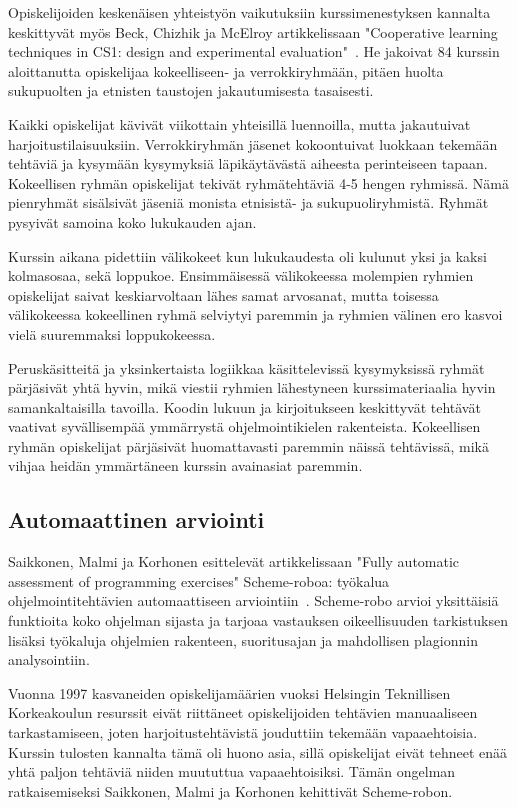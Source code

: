 \documentclass[finnish]{../tktltiki2}
\theoremstyle{definition}
\theoremstyle{remark}
\begin{document}
Opiskelijoiden keskenäisen yhteistyön vaikutuksiin kurssimenestyksen kannalta keskittyvät myös Beck, Chizhik ja McElroy artikkelissaan "Cooperative learning techniques in CS1: design and experimental evaluation"~\cite{BCM05}. He jakoivat 84 kurssin aloittanutta opiskelijaa kokeelliseen- ja verrokkiryhmään, pitäen huolta sukupuolten ja etnisten taustojen jakautumisesta tasaisesti.

Kaikki opiskelijat kävivät viikottain yhteisillä luennoilla, mutta jakautuivat harjoitustilaisuuksiin. Verrokkiryhmän jäsenet kokoontuivat luokkaan tekemään tehtäviä ja kysymään kysymyksiä läpikäytävästä aiheesta perinteiseen tapaan. Kokeellisen ryhmän opiskelijat tekivät ryhmätehtäviä 4-5 hengen ryhmissä. Nämä pienryhmät sisälsivät jäseniä monista etnisistä- ja sukupuoliryhmistä. Ryhmät pysyivät samoina koko lukukauden ajan.

Kurssin aikana pidettiin välikokeet kun lukukaudesta oli kulunut yksi ja kaksi kolmasosaa, sekä loppukoe. Ensimmäisessä välikokeessa molempien ryhmien opiskelijat saivat keskiarvoltaan lähes samat arvosanat, mutta toisessa välikokeessa kokeellinen ryhmä selviytyi paremmin ja ryhmien välinen ero kasvoi vielä suuremmaksi loppukokeessa.

Peruskäsitteitä ja yksinkertaista logiikkaa käsittelevissä kysymyksissä ryhmät pärjäsivät yhtä hyvin, mikä viestii ryhmien lähestyneen kurssimateriaalia hyvin samankaltaisilla tavoilla. Koodin lukuun ja kirjoitukseen keskittyvät tehtävät vaativat syvällisempää ymmärrystä ohjelmointikielen rakenteista. Kokeellisen ryhmän opiskelijat pärjäsivät huomattavasti paremmin näissä tehtävissä, mikä vihjaa heidän ymmärtäneen kurssin avainasiat paremmin.

\subsection{Automaattinen arviointi}

Saikkonen, Malmi ja Korhonen esittelevät artikkelissaan "Fully automatic assessment of programming exercises" Scheme-roboa: työkalua ohjelmointitehtävien automaattiseen arviointiin~\cite{SMK01}. Scheme-robo arvioi yksittäisiä funktioita koko ohjelman sijasta ja tarjoaa vastauksen oikeellisuuden tarkistuksen lisäksi työkaluja ohjelmien rakenteen, suoritusajan ja mahdollisen plagionnin analysointiin.

Vuonna 1997 kasvaneiden opiskelijamäärien vuoksi Helsingin Teknillisen Korkeakoulun resurssit eivät riittäneet opiskelijoiden tehtävien manuaaliseen tarkastamiseen, joten harjoitustehtävistä jouduttiin tekemään vapaaehtoisia. Kurssin tulosten kannalta tämä oli huono asia, sillä opiskelijat eivät tehneet enää yhtä paljon tehtäviä niiden muututtua vapaaehtoisiksi. Tämän ongelman ratkaisemiseksi Saikkonen, Malmi ja Korhonen kehittivät Scheme-robon.
\end{document}
